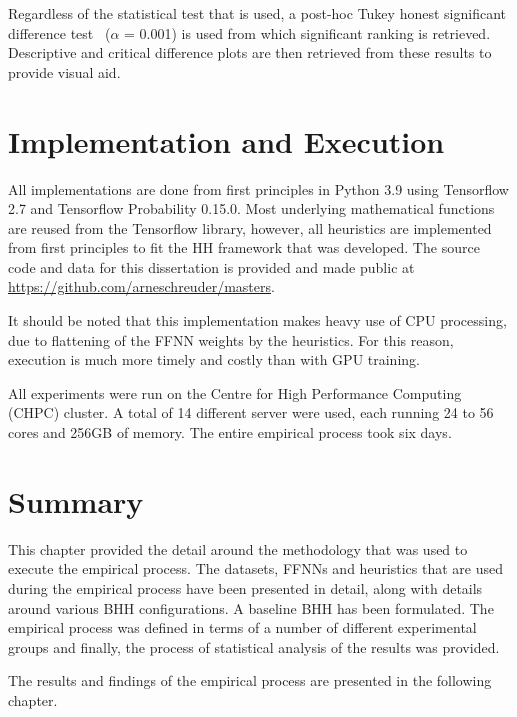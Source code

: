 Regardless of the statistical test that is used, a post-hoc Tukey honest significant difference test~\cite{ref:tukey:1949} ($\alpha$ = 0.001) is used from which significant ranking is retrieved. Descriptive and critical difference plots are then retrieved from these results to provide visual aid.

\section{Implementation and Execution}\label{sec:methodology:implementation}

All implementations are done from first principles in Python 3.9 using Tensorflow 2.7 and Tensorflow Probability 0.15.0. Most underlying mathematical functions are reused from the Tensorflow library, however, all heuristics are implemented from first principles to fit the \acs{HH} framework that was developed. The source code and data for this dissertation is provided and made public at \url{https://github.com/arneschreuder/masters}.

It should be noted that this implementation makes heavy use of CPU processing, due to flattening of the \acs{FFNN} weights by the heuristics. For this reason, execution is much more timely and costly than with GPU training.

All experiments were run on the Centre for High Performance Computing (CHPC) cluster. A total of 14 different server were used, each running 24 to 56 cores and 256GB of memory. The entire empirical process took six days.

\section{Summary}\label{sec:methodology:summary}

This chapter provided the detail around the methodology that was used to execute the empirical process. The datasets, \acp{FFNN} and heuristics that are used during the empirical process have been presented in detail, along with details around various \acs{BHH} configurations. A baseline \acs{BHH} has been formulated. The empirical process was defined in terms of a number of different experimental groups and finally, the process of statistical analysis of the results was provided.

The results and findings of the empirical process are presented in the following chapter.
